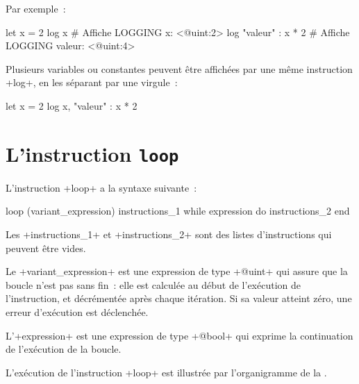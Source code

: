 Par exemple~:
\begin{galgas3}
let x = 2
log x # Affiche LOGGING x: <@uint:2>
log "valeur" : x * 2 # Affiche LOGGING valeur: <@uint:4>
\end{galgas3}

Plusieurs variables ou constantes peuvent être affichées par une même instruction \ggst+log+, en les séparant par une virgule~:
\begin{galgas3}
let x = 2
log x, "valeur" : x * 2
\end{galgas3}














\section{L'instruction \texttt{loop}}


L'instruction \ggst+loop+ a la syntaxe suivante~:
\begin{galgas3box}
loop (variant_expression)
  instructions_1
while expression do
  instructions_2
end
\end{galgas3box}


Les \ggst+instructions_1+ et \ggst+instructions_2+ sont des listes d'instructions qui peuvent être vides.


Le \ggst+variant_expression+ est une expression de type \ggst+@uint+ qui assure que la boucle n'est pas sans fin~: elle est calculée au début de l'exécution de l'instruction, et décrémentée après chaque itération. Si sa valeur atteint zéro, une erreur d'exécution est déclenchée.

L'\ggst+expression+ est une expression de type \ggst+@bool+ qui exprime la continuation de l'exécution de la boucle.

L'exécution de l'instruction \ggst+loop+ est illustrée par l'organigramme de la .



